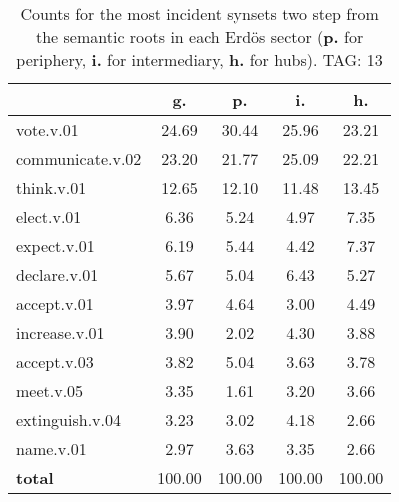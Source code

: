 \begin{table}[h!]
\begin{center}
\begin{tabular}{| l || c | c | c | c |}\hline
 & {\bf g.} & {\bf p.} & {\bf i.} & {\bf h.} \\\hline\hline
vote.v.01 & 24.69  & 30.44  & 25.96  & 23.21 \\\hline
communicate.v.02 & 23.20  & 21.77  & 25.09  & 22.21 \\\hline
think.v.01 & 12.65  & 12.10  & 11.48  & 13.45 \\\hline
elect.v.01 & 6.36  & 5.24  & 4.97  & 7.35 \\\hline
expect.v.01 & 6.19  & 5.44  & 4.42  & 7.37 \\\hline
declare.v.01 & 5.67  & 5.04  & 6.43  & 5.27 \\\hline
accept.v.01 & 3.97  & 4.64  & 3.00  & 4.49 \\\hline
increase.v.01 & 3.90  & 2.02  & 4.30  & 3.88 \\\hline
accept.v.03 & 3.82  & 5.04  & 3.63  & 3.78 \\\hline
meet.v.05 & 3.35  & 1.61  & 3.20  & 3.66 \\\hline
extinguish.v.04 & 3.23  & 3.02  & 4.18  & 2.66 \\\hline
name.v.01 & 2.97  & 3.63  & 3.35  & 2.66 \\\hline\hline
{{\bf total}} & 100.00  & 100.00  & 100.00  & 100.00 \\\hline
\end{tabular}
\caption{Counts for the most incident synsets two step from the semantic roots in each Erd\"os sector ({\bf p.} for periphery, {\bf i.} for intermediary, {\bf h.} for hubs). TAG: 13}
\end{center}
\end{table}